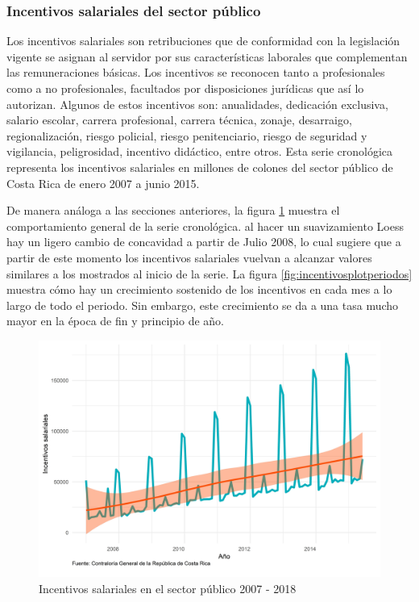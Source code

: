 \documentclass[
]{article}
\begin{document}
\subsubsection{Incentivos salariales del sector público}

Los incentivos salariales son retribuciones que de conformidad con la
legislación vigente se asignan al servidor por sus características
laborales que complementan las remuneraciones básicas. Los incentivos se
reconocen tanto a profesionales como a no profesionales, facultados por
disposiciones jurídicas que así lo autorizan. Algunos de estos
incentivos son: anualidades, dedicación exclusiva, salario escolar,
carrera profesional, carrera técnica, zonaje, desarraigo,
regionalización, riesgo policial, riesgo penitenciario, riesgo de
seguridad y vigilancia, peligrosidad, incentivo didáctico, entre otros.
Esta serie cronológica representa los incentivos salariales en millones
de colones del sector público de Costa Rica de enero 2007 a junio 2015.

De manera análoga a las secciones anteriores, la figura
\ref{fig:incentivosplotgeneral} muestra el comportamiento general de la
serie cronológica. al hacer un suavizamiento Loess hay un ligero cambio
de concavidad a partir de Julio 2008, lo cual sugiere que a partir de
este momento los incentivos salariales vuelvan a alcanzar valores
similares a los mostrados al inicio de la serie. La figura
\ref{fig:incentivosplotperiodos} muestra cómo hay un crecimiento
sostenido de los incentivos en cada mes a lo largo de todo el periodo.
Sin embargo, este crecimiento se da a una tasa mucho mayor en la época
de fin y principio de año.

\begin{figure}[!h]
\includegraphics[width=1\linewidth,height=1\textheight]{Tesis_files/figure-latex/incentivosplotgeneral-1} \caption{Incentivos salariales en el sector público 2007 - 2018}\label{fig:incentivosplotgeneral}
\end{figure}
\end{document}
